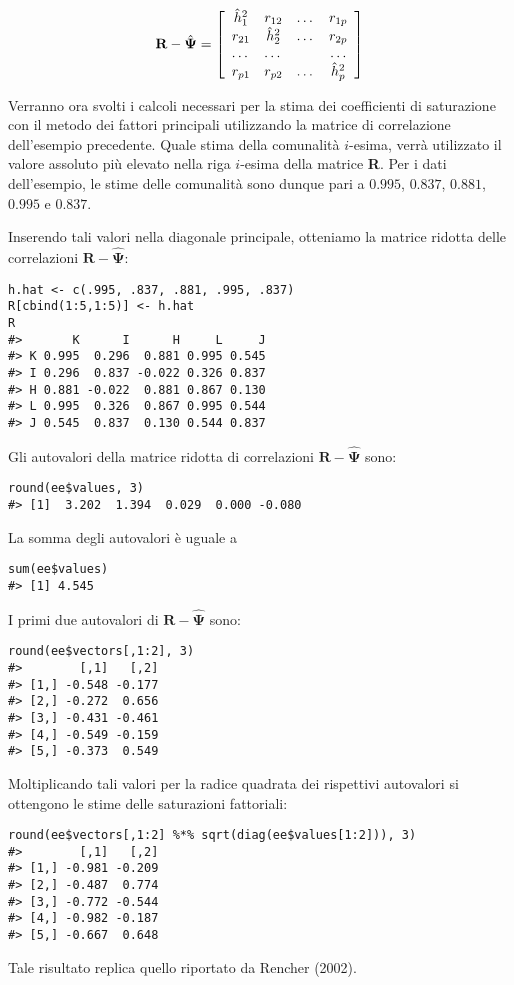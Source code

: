 \begin{equation}
\textbf{R} - \hat{\boldsymbol{\Psi}} = 
\left[
  \begin{array}{ c c c c }
    \hat{h}^2_1 & r_{12} & \dots & r_{1p} \\
    r_{21} & \hat{h}^2_2 & \dots & r_{2p} \\
    \dots & \dots &           & \dots\\
    r_{p1} &  r_{p2} & \dots & \hat{h}^2_p
  \end{array} 
\right] 
\end{equation}

Verranno ora svolti i calcoli necessari per la stima dei coefficienti di saturazione con il metodo dei fattori principali utilizzando   la
matrice di correlazione dell'esempio precedente. 
 Quale stima della comunalità $i$-esima, verrà utilizzato 
il valore assoluto più
elevato nella riga $i$-esima della
matrice \textbf{R}.  Per i dati dell'esempio, le stime delle comunalità sono dunque pari a $0.995$, $0.837$, $0.881$, $0.995$ e $0.837$. 

Inserendo tali valori nella diagonale principale, otteniamo la matrice ridotta delle correlazioni $\textbf{R} - \hat{\boldsymbol{\Psi}}$:
\begin{lstlisting}
h.hat <- c(.995, .837, .881, .995, .837)
R[cbind(1:5,1:5)] <- h.hat
R
#>       K      I      H     L     J
#> K 0.995  0.296  0.881 0.995 0.545
#> I 0.296  0.837 -0.022 0.326 0.837
#> H 0.881 -0.022  0.881 0.867 0.130
#> L 0.995  0.326  0.867 0.995 0.544
#> J 0.545  0.837  0.130 0.544 0.837
\end{lstlisting}
Gli autovalori della matrice ridotta di correlazioni $\textbf{R} - \hat{\boldsymbol{\Psi}}$ sono:
\begin{lstlisting}
round(ee$values, 3)
#> [1]  3.202  1.394  0.029  0.000 -0.080
\end{lstlisting}
La somma degli autovalori è uguale a
\begin{lstlisting}
sum(ee$values)
#> [1] 4.545
\end{lstlisting}
I primi due autovalori di  $\textbf{R} - \hat{\boldsymbol{\Psi}}$ sono:
\begin{lstlisting}
round(ee$vectors[,1:2], 3)
#>        [,1]   [,2]
#> [1,] -0.548 -0.177
#> [2,] -0.272  0.656
#> [3,] -0.431 -0.461
#> [4,] -0.549 -0.159
#> [5,] -0.373  0.549
\end{lstlisting}
Moltiplicando tali valori per la radice quadrata dei rispettivi autovalori si ottengono le stime delle saturazioni fattoriali:
\begin{lstlisting}
round(ee$vectors[,1:2] %*% sqrt(diag(ee$values[1:2])), 3)
#>        [,1]   [,2]
#> [1,] -0.981 -0.209
#> [2,] -0.487  0.774
#> [3,] -0.772 -0.544
#> [4,] -0.982 -0.187
#> [5,] -0.667  0.648
\end{lstlisting}
Tale risultato replica quello riportato da Rencher (2002). 


